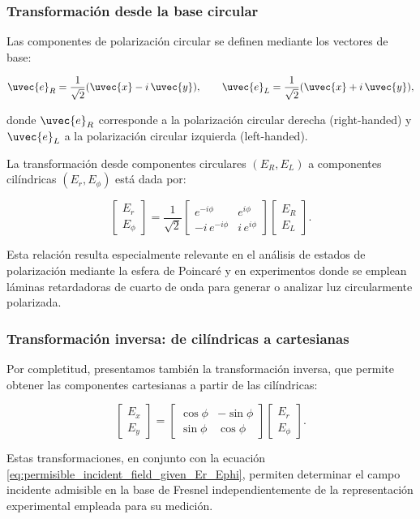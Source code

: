 \subsubsection{Transformación desde la base circular}

Las componentes de polarización circular se definen mediante los vectores de base:

\begin{equation}
\uvec{e}_R = \frac{1}{\sqrt{2}}(\uvec{x} - i\,\uvec{y}),
\qquad
\uvec{e}_L = \frac{1}{\sqrt{2}}(\uvec{x} + i\,\uvec{y}),
\label{eq:circular_basis_vectors}
\end{equation}

donde $\uvec{e}_R$ corresponde a la polarización circular derecha (right-handed) y $\uvec{e}_L$ a la polarización circular izquierda (left-handed).

La transformación desde componentes circulares $(E_R, E_L)$ a componentes cilíndricas $(E_r, E_\phi)$ está dada por:

\begin{equation}
\begin{bmatrix}
E_r \\[6pt]
E_\phi
\end{bmatrix}
=
\frac{1}{\sqrt{2}}
\begin{bmatrix}
e^{-i\phi} & e^{i\phi} \\[6pt]
-i\,e^{-i\phi} & i\,e^{i\phi}
\end{bmatrix}
\begin{bmatrix}
E_R \\[6pt]
E_L
\end{bmatrix}.
\label{eq:Er_Ephi_from_circular}
\end{equation}

Esta relación resulta especialmente relevante en el análisis de estados de polarización mediante la esfera de Poincaré y en experimentos donde se emplean láminas retardadoras de cuarto de onda para generar o analizar luz circularmente polarizada.

\subsubsection{Transformación inversa: de cilíndricas a cartesianas}

Por completitud, presentamos también la transformación inversa, que permite obtener las componentes cartesianas a partir de las cilíndricas:

\begin{equation}
\begin{bmatrix}
E_x \\[4pt]
E_y
\end{bmatrix}
=
\begin{bmatrix}
\cos\phi & -\sin\phi \\[4pt]
\sin\phi & \cos\phi
\end{bmatrix}
\begin{bmatrix}
E_r \\[4pt]
E_\phi
\end{bmatrix}.
\label{eq:cartesian_from_Er_Ephi}
\end{equation}

Estas transformaciones, en conjunto con la ecuación \eqref{eq:permisible_incident_field_given_Er_Ephi}, permiten determinar el campo incidente admisible en la base de Fresnel independientemente de la representación experimental empleada para su medición.
